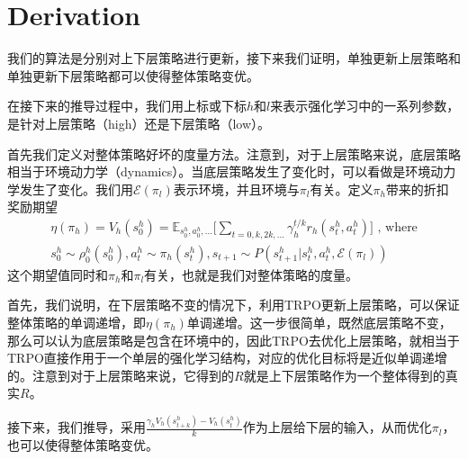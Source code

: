 \documentclass[degree=bachelor, tocarialchapter, pifootnote]{thuthesis}
\begin{document}

%

%


\mainmatter
%
%

\section{Derivation}
我们的算法是分别对上下层策略进行更新，接下来我们证明，单独更新上层策略和单独更新下层策略都可以使得整体策略变优。

在接下来的推导过程中，我们用上标或下标$h$和$l$来表示强化学习中的一系列参数，是针对上层策略（high）还是下层策略（low）。

首先我们定义对整体策略好坏的度量方法。注意到，对于上层策略来说，底层策略相当于环境动力学（dynamics）。当底层策略发生了变化时，可以看做是环境动力学发生了变化。我们用$\mathcal{E}(\pi_l)$表示环境，并且环境与$\pi_l$有关。定义$\pi_h$带来的折扣奖励期望
\begin{equation}
\begin{aligned}
  \eta(\pi_h) = V_h(s_0^h) = \mathbb{E}_{s_0^h, a_0^h, ...}\Bigg[\sum_{t = 0, k, 2k, ...} \gamma_h^{t/k} r_h(s_t^h, a_t^h)\Bigg] \text{ ,  where}   \\
  s_0^h \sim \rho_0^h(s_0^h), a_t^h \sim \pi_h(s_t^h), s_{t+1} \sim P(s_{t+1}^h|s_t^h, a_t^h, \mathcal{E}(\pi_l))
\end{aligned}
\end{equation}
这个期望值同时和$\pi_h$和$\pi_l$有关，也就是我们对整体策略的度量。

首先，我们说明，在下层策略不变的情况下，利用TRPO更新上层策略，可以保证整体策略的单调递增，即$\eta(\pi_h)$单调递增。这一步很简单，既然底层策略不变，那么可以认为底层策略是包含在环境中的，因此TRPO去优化上层策略，就相当于TRPO直接作用于一个单层的强化学习结构，对应的优化目标将是近似单调递增的。注意到对于上层策略来说，它得到的$R$就是上下层策略作为一个整体得到的真实$R$。

接下来，我们推导，采用$ \frac{\gamma_h V_h(s_{t + k}^h) - V_h(s_{t}^h)}{k}$作为上层给下层的输入，从而优化$\pi_l$，也可以使得整体策略变优。
\end{document}
